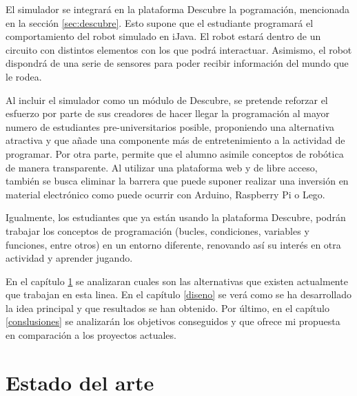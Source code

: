 El simulador se integrará en la plataforma Descubre la pogramación, mencionada en la sección \ref{sec:descubre}. Esto supone que el estudiante programará el comportamiento del robot simulado en iJava. El robot estará dentro de un circuito con distintos elementos con los que podrá interactuar. Asimismo, el robot dispondrá de una serie de sensores para poder recibir información del mundo que le rodea.

Al incluir el simulador como un módulo de Descubre, se pretende reforzar el esfuerzo por parte de sus creadores de hacer llegar la programación al mayor numero de estudiantes pre-universitarios posible, proponiendo una alternativa atractiva y que añade una componente más de entretenimiento a la actividad de programar. Por otra parte, permite que el alumno asimile conceptos de robótica de manera transparente. Al utilizar una plataforma web y de libre acceso, también se busca eliminar la barrera que puede suponer realizar una inversión en material electrónico como puede ocurrir con Arduino, Raspberry Pi o Lego.


Igualmente, los estudiantes que ya están usando la plataforma Descubre, podrán trabajar los conceptos de programación (bucles, condiciones, variables y funciones, entre otros) en un entorno diferente, renovando así su interés en otra actividad y aprender jugando.




En el capítulo \ref{estado-arte} se analizaran cuales son las alternativas que existen actualmente que trabajan en esta linea. En el capítulo \ref{diseno} se verá como se ha desarrollado la idea principal y que resultados se han obtenido. Por último, en el capítulo \ref{conslusiones} se analizarán los objetivos conseguidos y que ofrece mi propuesta en comparación a los proyectos actuales.



\chapter{Estado del arte}\label{estado-arte}



